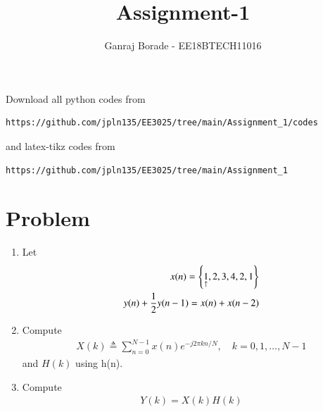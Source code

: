 \documentclass[journal,12pt,twocolumn]{IEEEtran}
\renewcommand\thesection{\arabic{section}}
\begin{document}
     \def\rightbox#1{\makebox[0in][r]{#1}}
     \def\centbox#1{\makebox[0in]{#1}}
     \def\topbox#1{\raisebox{-\baselineskip}[0in][0in]{#1}}
     \def\midbox#1{\raisebox{-0.5\baselineskip}[0in][0in]{#1}}
\vspace{3cm}
\title{Assignment-1}
\author{Ganraj Borade - EE18BTECH11016}
\maketitle
\newpage
\bigskip
\renewcommand{\thefigure}{\theenumi}
\renewcommand{\thetable}{\theenumi}
Download all python codes from 
\begin{lstlisting}
https://github.com/jpln135/EE3025/tree/main/Assignment_1/codes
\end{lstlisting}
%
and latex-tikz codes from 
%
\begin{lstlisting}
https://github.com/jpln135/EE3025/tree/main/Assignment_1
\end{lstlisting}

\section{Problem}
\begin{enumerate}[label=\thesection.\arabic*.,ref=\thesection.\theenumi]
    
    \item Let
    \begin{align}
        x(n) = \cbrak{\underset{\uparrow}{1},2,3,4,2,1}
         \label{eq:equation0}\\
        y(n) + \frac{1}{2}y(n-1) = x(n) + x(n-2)	
        \label{eq:equation1}
    \end{align}
    
    \item Compute 
    \begin{align}
        X(k) \triangleq \sum_{n=0}^{N-1} x(n) e^{-j 2 \pi k n / N}, \quad k=0,1, \ldots, N-1
    \end{align}
    and $H(k)$ using h(n).
    
    \item Compute 
    \begin{align}
    Y(k) = X(k)H(k)
    \end{align}
\end{enumerate}
\end{document}
